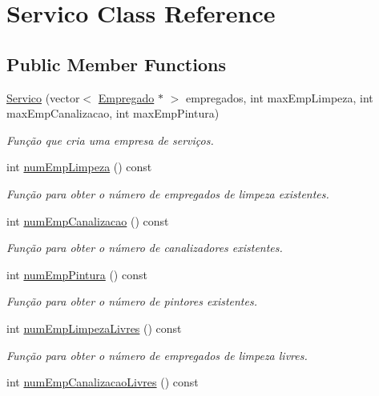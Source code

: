 \hypertarget{class_servico}{}\section{Servico Class Reference}
\label{class_servico}
\subsection*{Public Member Functions}
\begin{DoxyCompactItemize}
\item 
\hyperlink{class_servico_a920dbd3231fa6ca3ba9e118764bb7d4b}{Servico} (vector$<$ \hyperlink{class_empregado}{Empregado} $\ast$ $>$ empregados, int max\+Emp\+Limpeza, int max\+Emp\+Canalizacao, int max\+Emp\+Pintura)
\begin{DoxyCompactList}\small\item\em Função que cria uma empresa de serviços. \end{DoxyCompactList}\item 
int \hyperlink{class_servico_a590ca90b6563c337eeb55b08255a4894}{num\+Emp\+Limpeza} () const 
\begin{DoxyCompactList}\small\item\em Função para obter o número de empregados de limpeza existentes. \end{DoxyCompactList}\item 
int \hyperlink{class_servico_a09dedacf7c261a12e86e263510748c74}{num\+Emp\+Canalizacao} () const 
\begin{DoxyCompactList}\small\item\em Função para obter o número de canalizadores existentes. \end{DoxyCompactList}\item 
int \hyperlink{class_servico_a9e2a6c88d5e6aa250fe4472cd2cec3bf}{num\+Emp\+Pintura} () const 
\begin{DoxyCompactList}\small\item\em Função para obter o número de pintores existentes. \end{DoxyCompactList}\item 
int \hyperlink{class_servico_a6cd98c383025f6a00a4314caab86a016}{num\+Emp\+Limpeza\+Livres} () const 
\begin{DoxyCompactList}\small\item\em Função para obter o número de empregados de limpeza livres. \end{DoxyCompactList}\item 
int \hyperlink{class_servico_a459265d6c8a9a6e5e4c33e8aada812bb}{num\+Emp\+Canalizacao\+Livres} () const 

\end{DoxyCompactItemize}
